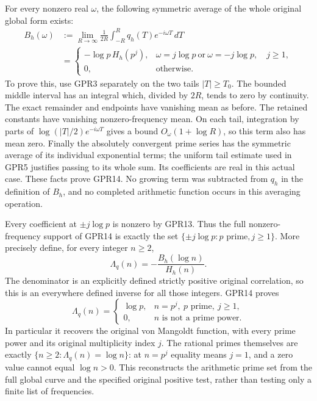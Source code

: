 For every nonzero real $\omega$, the following symmetric
average of the whole original global form exists:
\begin{equation}\tag{GPR14}
 \begin{split}
 B_h(\omega)
 &:=\lim_{R\to\infty}\frac1{2R}
                 \int_{-R}^Rq_h(T)e^{-i\omega T}\,dT\\
 &=
 \begin{cases}
 -\log p\,H_h(p^j),&
        \omega=j\log p\ \text{or}\ \omega=-j\log p,\quad j\ge1,\\
 0,&\text{otherwise}.
 \end{cases}
 \end{split}
\end{equation}
To prove this, use GPR3 separately on the two tails
$|T|\ge T_0$. The bounded middle interval has an integral
which, divided by $2R$, tends to zero by continuity.
The exact remainder and endpoints have vanishing mean
as before. The retained constants have vanishing
nonzero-frequency mean.
On each tail, integration by parts of
$\log(|T|/2)e^{-i\omega T}$ gives a bound
$O_\omega(1+\log R)$, so this term also has mean zero.
Finally the absolutely convergent prime series has the
symmetric average of its individual exponential terms;
the uniform tail estimate used in GPR5 justifies passing
to its whole sum. Its coefficients are real in this
actual case. These facts prove GPR14.
No growing term was subtracted from $q_h$ in the
definition of $B_h$, and no completed arithmetic
function occurs in this averaging operation.

Every coefficient at $\pm j\log p$ is nonzero by GPR13.
Thus the full nonzero-frequency support of GPR14 is
exactly the set $\{\pm j\log p:p\text{ prime},j\ge1\}$.
More precisely define, for every integer $n\ge2$,
\begin{equation}\tag{GPR15}
 \Lambda_q(n)=-\frac{B_h(\log n)}{H_h(n)}.
\end{equation}
The denominator is an explicitly defined strictly
positive original correlation, so this is an everywhere
defined inverse for all those integers. GPR14 proves
\[
 \Lambda_q(n)=
 \begin{cases}
 \log p,&n=p^j,\ p\text{ prime},\ j\ge1,\\
 0,&n\text{ is not a prime power}.
 \end{cases}
\]
In particular it recovers the original von Mangoldt
function, with every prime power and its original
multiplicity index $j$. The rational primes themselves
are exactly
$\{n\ge2:\Lambda_q(n)=\log n\}$:
at $n=p^j$ equality means $j=1$, and a zero value cannot
equal $\log n>0$. This reconstructs the arithmetic
prime set from the full global curve and the specified
original positive test, rather than testing only a
finite list of frequencies.

